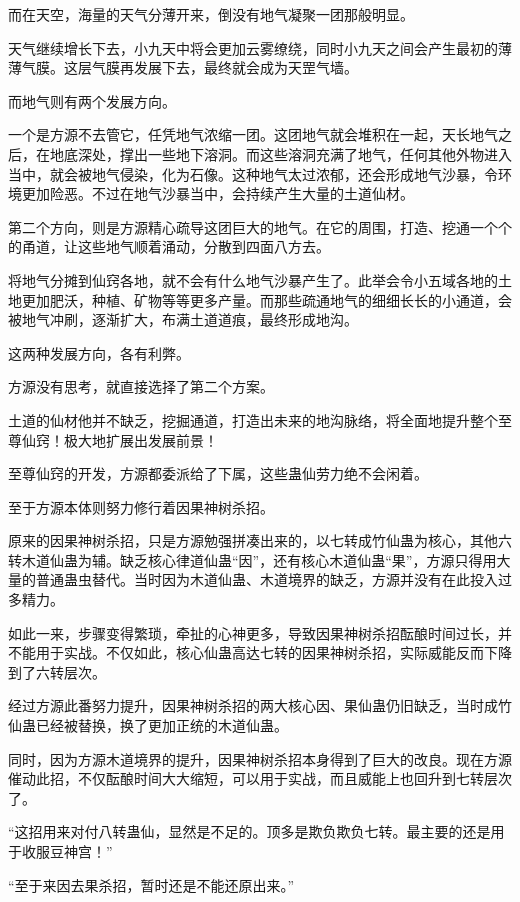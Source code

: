 \begin{this_body}
而在天空，海量的天气分薄开来，倒没有地气凝聚一团那般明显。

天气继续增长下去，小九天中将会更加云雾缭绕，同时小九天之间会产生最初的薄薄气膜。这层气膜再发展下去，最终就会成为天罡气墙。

而地气则有两个发展方向。

一个是方源不去管它，任凭地气浓缩一团。这团地气就会堆积在一起，天长地气之后，在地底深处，撑出一些地下溶洞。而这些溶洞充满了地气，任何其他外物进入当中，就会被地气侵染，化为石像。这种地气太过浓郁，还会形成地气沙暴，令环境更加险恶。不过在地气沙暴当中，会持续产生大量的土道仙材。

第二个方向，则是方源精心疏导这团巨大的地气。在它的周围，打造、挖通一个个的甬道，让这些地气顺着涌动，分散到四面八方去。

将地气分摊到仙窍各地，就不会有什么地气沙暴产生了。此举会令小五域各地的土地更加肥沃，种植、矿物等等更多产量。而那些疏通地气的细细长长的小通道，会被地气冲刷，逐渐扩大，布满土道道痕，最终形成地沟。

这两种发展方向，各有利弊。

方源没有思考，就直接选择了第二个方案。

土道的仙材他并不缺乏，挖掘通道，打造出未来的地沟脉络，将全面地提升整个至尊仙窍！极大地扩展出发展前景！

至尊仙窍的开发，方源都委派给了下属，这些蛊仙劳力绝不会闲着。

至于方源本体则努力修行着因果神树杀招。

原来的因果神树杀招，只是方源勉强拼凑出来的，以七转成竹仙蛊为核心，其他六转木道仙蛊为辅。缺乏核心律道仙蛊“因”，还有核心木道仙蛊“果”，方源只得用大量的普通蛊虫替代。当时因为木道仙蛊、木道境界的缺乏，方源并没有在此投入过多精力。

如此一来，步骤变得繁琐，牵扯的心神更多，导致因果神树杀招酝酿时间过长，并不能用于实战。不仅如此，核心仙蛊高达七转的因果神树杀招，实际威能反而下降到了六转层次。

经过方源此番努力提升，因果神树杀招的两大核心因、果仙蛊仍旧缺乏，当时成竹仙蛊已经被替换，换了更加正统的木道仙蛊。

同时，因为方源木道境界的提升，因果神树杀招本身得到了巨大的改良。现在方源催动此招，不仅酝酿时间大大缩短，可以用于实战，而且威能上也回升到七转层次了。

“这招用来对付八转蛊仙，显然是不足的。顶多是欺负欺负七转。最主要的还是用于收服豆神宫！”

“至于来因去果杀招，暂时还是不能还原出来。”


\end{this_body}
